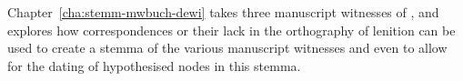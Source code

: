 Chapter~\ref{cha:stemm-mwbuch-dewi} takes three manuscript witnesses of , and explores how correspondences or their lack in the orthography of lenition can be used to create a stemma of the various manuscript witnesses and even to allow for the dating of hypothesised nodes in this stemma. 


